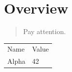 \section{Overview}

\begin{quote}
Pay attention.
\end{quote}

\begin{tabular}{ll}
Name & Value \\
Alpha & 42 \\
\end{tabular}
